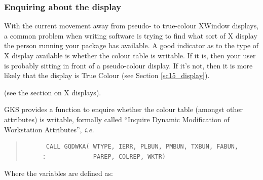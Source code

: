 \documentclass[twoside,11pt]{article}
\newcommand{\htmlref}[2]{#1}
\newcommand{\latex}[1]{#1}
\newcommand{\xref}[3]{#1}
\begin{document}


\subsubsection{Enquiring about the display}

With the current movement away from pseudo- to true-colour XWindow
displays, a common problem when writing software is trying to find
what sort of X display the person running your package has available.
A good indicator as to the type of X display available is whether the
colour table is writable. If it is, then your user is probably sitting
in front of a pseudo-colour display. If it's not, then it is more
likely that the display is True Colour \latex{ (see Section
\ref{sc15_display}).}
\begin{htmlonly}
(see the section on \htmlref{X displays}{sc15_display}).
\end{htmlonly}

GKS provides a function to enquire whether the colour table (amongst
other attributes) is writable, formally called ``Inquire Dynamic
Modification of Workstation Attributes'', {\em i.e.\ }

\small
\begin{quote}
\begin{verbatim}
      CALL GQDWKA( WTYPE, IERR, PLBUN, PMBUN, TXBUN, FABUN,
     :             PAREP, COLREP, WKTR)
\end{verbatim}
\end{quote}
\normalsize

Where the variables are defined as:
\end{document}
